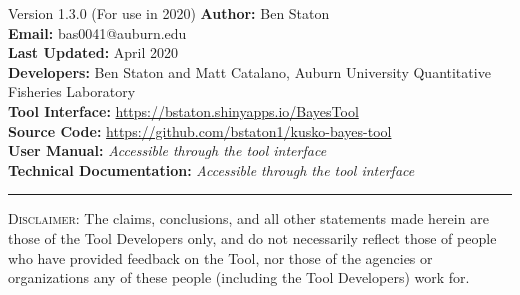 \begin{bclogo}[margeG=-1.5,margeD=-1.5,logo=\hspace{17pt},couleurBarre=black, noborder=false,couleur=light-grey]{Version 1.3.0 (For use in 2020)}
   \textbf{Author:} Ben Staton \\[3pt]
   \textbf{Email:} bas0041@auburn.edu \\[3pt]
   \textbf{Last Updated:} April 2020 \\[3pt]
   \textbf{Developers:} Ben Staton and Matt Catalano, Auburn University Quantitative Fisheries Laboratory \\[3pt]
   \textbf{Tool Interface:} \url{https://bstaton.shinyapps.io/BayesTool} \\[3pt]
   \textbf{Source Code:} \url{https://github.com/bstaton1/kusko-bayes-tool} \\[3pt]
   \textbf{User Manual:} \textit{Accessible through the tool interface} \\[3pt]
   \textbf{Technical Documentation:} \textit{Accessible through the tool interface}
  \hrule
  \footnotesize{\textsc{Disclaimer}: The claims, conclusions, and all other statements made herein are those of the Tool Developers only, and do not necessarily reflect those of people who have provided feedback on the Tool, nor those of the agencies or organizations any of these people (including the Tool Developers) work for}.
\end{bclogo}
